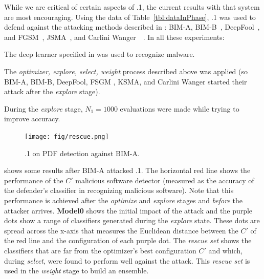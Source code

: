 While we are critical of certain aspects of {\IT}.1, the current 
results with that system are most encouraging. Using the data of Table~\ref{tbl:dataInPhase},
{\IT}.1 was used to defend against the attacking methods described in :
BIM-A, BIM-B~\cite{kurakin2016adversarial}, DeepFool~\cite{moosavi2016deepfool}, and FGSM~\cite{goodfellow2014explaining}, JSMA~\cite{papernot2016limitations}, and Carlini Wanger~\cite{carlini2017towards}~\cite{DBLP:conf/ccs/Carlini017}.
In all these experiments:
\bi
\item
The deep learner specified in 
 was used to recognize malware. 
\item
The {\em optimizer, explore, select, weight}
process described above was applied
(so BIM-A, BIM-B, DeepFool, FSGM , KSMA, and Carlini Wanger
started their attack after the {\em explore}
stage).
\item
During the {\em explore} stage, $N_1=1000$ evaluations were made while trying to improve
accuracy.
\ei

\begin{figure}
\texttt{[image: fig/rescue.png]}
\caption{ {\IT}.1 on PDF detection against
BIM-A.}
\label{fig:rescue}
\end{figure}
\noindent
{} shows some results after BIM-A attacked {\IT}.1.
The horizontal red line shows the performance of the $C'$
malicious  software detector
(measured as the accuracy of the defender's   classifier in recognizing malicious software). Note that this performance is achieved after the {\em optimize} and {\em explore} stages and {\em before} the attacker arrives. 
{\bf Model0} shows the initial impact of the attack and
the purple dots show a range of classifiers generated during the {\em explore} state. These dots are spread across the x-axis that measures the Euclidean distance between the $C'$ of the red line and the configuration of each purple dot.
The {\em rescue set} shows the classifiers that are far from the optimizer's best configuration  $C'$ and which, during {\em select}, were found to perform well against the attack.
This {\em rescue set} is used in the {\em weight} stage to build an ensemble.
 



